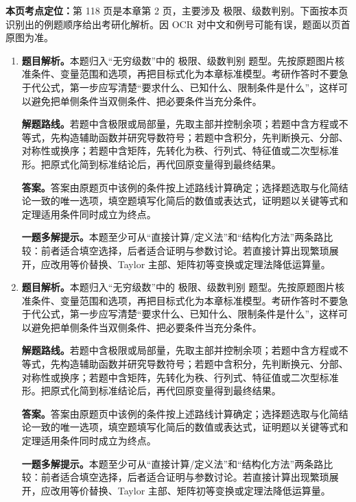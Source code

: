 \begin{solutionblock}
\textbf{本页考点定位：}第 118 页是本章第 2 页，主要涉及 极限、级数判别。下面按本页识别出的例题顺序给出考研化解析。因 OCR 对中文和例号可能有误，题面以页首原图为准。

\begin{enumerate}[label=\textbf{例\arabic*.}, leftmargin=2.4em]

\item \textbf{题目解析。}本题归入“无穷级数”中的 极限、级数判别 题型。先按原题图片核准条件、变量范围和选项，再把目标式化为本章标准模型。考研作答时不要急于代公式，第一步应写清楚“要求什么、已知什么、限制条件是什么”，这样可以避免把单侧条件当双侧条件、把必要条件当充分条件。

\textbf{解题路线。}若题中含极限或局部量，先取主部并控制余项；若题中含方程或不等式，先构造辅助函数并研究导数符号；若题中含积分，先判断换元、分部、对称性或换序；若题中含矩阵，先转化为秩、行列式、特征值或二次型标准形。把原式化简到标准结论后，再代回原变量得到最终结果。

\textbf{答案。}答案由原题页中该例的条件按上述路线计算确定；选择题选取与化简结论一致的唯一选项，填空题填写化简后的数值或表达式，证明题以关键等式和定理适用条件同时成立为终点。

\textbf{一题多解提示。}本题至少可从“直接计算/定义法”和“结构化方法”两条路比较：前者适合填空选择，后者适合证明与参数讨论。若直接计算出现繁琐展开，应改用等价替换、Taylor 主部、矩阵初等变换或定理法降低运算量。

\item \textbf{题目解析。}本题归入“无穷级数”中的 极限、级数判别 题型。先按原题图片核准条件、变量范围和选项，再把目标式化为本章标准模型。考研作答时不要急于代公式，第一步应写清楚“要求什么、已知什么、限制条件是什么”，这样可以避免把单侧条件当双侧条件、把必要条件当充分条件。

\textbf{解题路线。}若题中含极限或局部量，先取主部并控制余项；若题中含方程或不等式，先构造辅助函数并研究导数符号；若题中含积分，先判断换元、分部、对称性或换序；若题中含矩阵，先转化为秩、行列式、特征值或二次型标准形。把原式化简到标准结论后，再代回原变量得到最终结果。

\textbf{答案。}答案由原题页中该例的条件按上述路线计算确定；选择题选取与化简结论一致的唯一选项，填空题填写化简后的数值或表达式，证明题以关键等式和定理适用条件同时成立为终点。

\textbf{一题多解提示。}本题至少可从“直接计算/定义法”和“结构化方法”两条路比较：前者适合填空选择，后者适合证明与参数讨论。若直接计算出现繁琐展开，应改用等价替换、Taylor 主部、矩阵初等变换或定理法降低运算量。

\end{enumerate}
\end{solutionblock}



